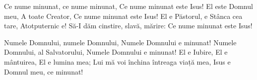 \beginverse
Ce nume minunat, ce nume minunat,
Ce nume minunat este Isus!
El este Domnul meu,
A toate Creator,
Ce nume minunat este Isus!
El e Păstorul, e Stânca cea tare,
Atotputernic e!
Să-I dăm cinstire, slavă, mărire:
Ce nume minunat este Isus!
\endverse

\beginverse
Numele Domnului, numele Domnului,
Numele Domnului e minunat!
Numele Domnului, al Salvatorului,
Numele Domnului e minunat!
El e Iubire, El e mântuirea,
El e lumina mea;
Lui mă voi închina întreaga viață mea,
Isus e Domnul meu, ce minunat!
\endverse
\endsong